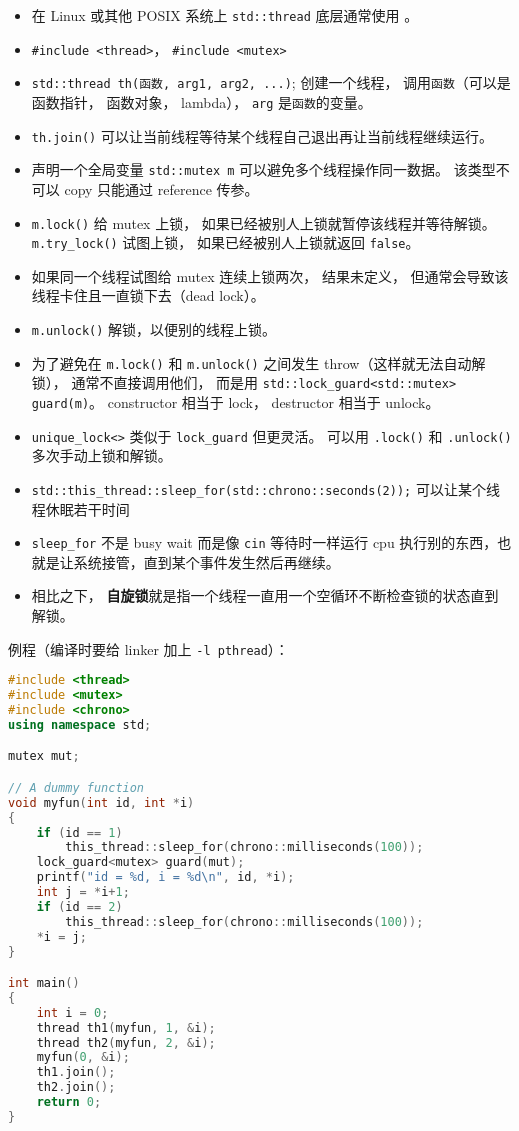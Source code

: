 
\begin{itemize}
\item 在 Linux 或其他 POSIX 系统上 \verb`std::thread` 底层通常使用 。
\item \verb`#include <thread>`， \verb`#include <mutex>`
\item \verb`std::thread th(函数, arg1, arg2, ...)`; 创建一个线程， 调用\verb`函数`（可以是函数指针， 函数对象， lambda）， \verb`arg` 是\verb`函数`的变量。
\item \verb`th.join()` 可以让当前线程等待某个线程自己退出再让当前线程继续运行。
\item 声明一个全局变量 \verb`std::mutex m` 可以避免多个线程操作同一数据。 该类型不可以 copy 只能通过 reference 传参。
\item \verb`m.lock()` 给 mutex 上锁， 如果已经被别人上锁就暂停该线程并等待解锁。 \verb`m.try_lock()` 试图上锁， 如果已经被别人上锁就返回 \verb`false`。
\item 如果同一个线程试图给 mutex 连续上锁两次， 结果未定义， 但通常会导致该线程卡住且一直锁下去（dead lock）。
\item \verb`m.unlock()` 解锁，以便别的线程上锁。
\item 为了避免在 \verb`m.lock()` 和 \verb`m.unlock()` 之间发生 throw（这样就无法自动解锁）， 通常不直接调用他们， 而是用 \verb`std::lock_guard<std::mutex> guard(m)`。 constructor 相当于 lock， destructor 相当于 unlock。
\item \verb`unique_lock<>` 类似于 \verb`lock_guard` 但更灵活。 可以用 \verb`.lock()` 和 \verb`.unlock()` 多次手动上锁和解锁。
\item \verb`std::this_thread::sleep_for(std::chrono::seconds(2));` 可以让某个线程休眠若干时间
\item \verb`sleep_for` 不是 busy wait 而是像 \verb`cin` 等待时一样运行 cpu 执行别的东西，也就是让系统接管，直到某个事件发生然后再继续。
\item 相比之下， \textbf{自旋锁}就是指一个线程一直用一个空循环不断检查锁的状态直到解锁。
\end{itemize}

例程（编译时要给 linker 加上 \verb`-l pthread`）：
\begin{lstlisting}[language=cpp]
#include <thread>
#include <mutex>
#include <chrono>
using namespace std;

mutex mut;

// A dummy function
void myfun(int id, int *i)
{
    if (id == 1)
        this_thread::sleep_for(chrono::milliseconds(100));
    lock_guard<mutex> guard(mut);
    printf("id = %d, i = %d\n", id, *i);
    int j = *i+1;
    if (id == 2)
        this_thread::sleep_for(chrono::milliseconds(100));
    *i = j;
}

int main()
{
    int i = 0;
    thread th1(myfun, 1, &i);
    thread th2(myfun, 2, &i);
    myfun(0, &i);
    th1.join();
    th2.join();
    return 0;
}
\end{lstlisting}

